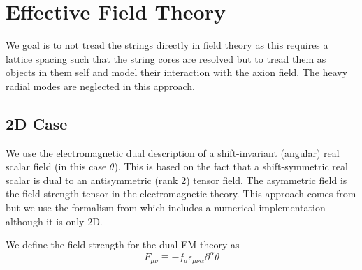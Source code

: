\documentclass[a4paper]{article}
\begin{document}
\section{Effective Field Theory}
We goal is to not tread the strings directly in field theory as this requires a lattice spacing such that the 
string cores are resolved but to tread them as objects in them self and model their interaction with the axion field.
The heavy radial modes are neglected in this approach. 

\subsection{2D Case}
We use the electromagnetic dual description of a shift-invariant (angular) real scalar field (in this case $\theta$).
This is based on the fact that a shift-symmetric real scalar is dual to an antisymmetric (rank 2) tensor field.
The asymmetric field is the field strength tensor in the electromagnetic theory.
This approach comes from \cite{pinning_down_the_axion_DABHOLKAR1990815} but we use the formalism from \cite{Axion2D_Fleury:2016xrz} which includes a numerical implementation although it is only 2D.

We define the field strength for the dual EM-theory as
\begin{equation}
	F_{\mu \nu} \equiv - f_a \epsilon_{\mu \nu \alpha} \partial^\alpha \theta
\end{equation}
\end{document}
